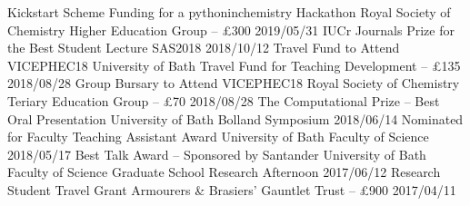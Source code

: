 \begin{cvpubs}
  \cvpub
    {Kickstart Scheme Funding for a pythoninchemistry Hackathon}
    {Royal Society of Chemistry Higher Education Group -- £300}
    {2019/05/31}
  \cvpub
    {IUCr Journals Prize for the Best Student Lecture}
    {SAS2018}
    {2018/10/12}
  \cvpub
    {Travel Fund to Attend VICEPHEC18}
    {University of Bath Travel Fund for Teaching Development -- £135}
    {2018/08/28}
  \cvpub
    {Group Bursary to Attend VICEPHEC18}
    {Royal Society of Chemistry Teriary Education Group -- £70}
    {2018/08/28}
  \cvpub
    {The Computational Prize -- Best Oral Presentation}
    {University of Bath Bolland Symposium}
    {2018/06/14}
  \cvpub
    {Nominated for Faculty Teaching Assistant Award}
    {University of Bath Faculty of Science}
    {2018/05/17}
  \cvpub
    {Best Talk Award -- Sponsored by Santander}
    {University of Bath Faculty of Science Graduate School Research Afternoon}
    {2017/06/12}
  \cvpub
    {Research Student Travel Grant}
    {Armourers \& Brasiers' Gauntlet Trust -- £900}
    {2017/04/11}
\end{cvpubs}
